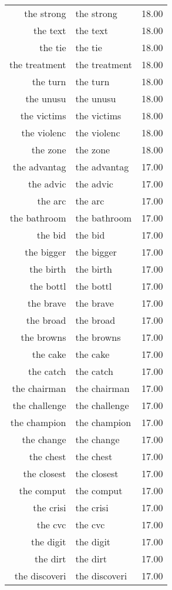 \begin{table}[ht]
\begin{tabular}{rlr}
  the strong & the strong & 18.00 \\ 
  the text & the text & 18.00 \\ 
  the tie & the tie & 18.00 \\ 
  the treatment & the treatment & 18.00 \\ 
  the turn & the turn & 18.00 \\ 
  the unusu & the unusu & 18.00 \\ 
  the victims & the victims & 18.00 \\ 
  the violenc & the violenc & 18.00 \\ 
  the zone & the zone & 18.00 \\ 
  the advantag & the advantag & 17.00 \\ 
  the advic & the advic & 17.00 \\ 
  the arc & the arc & 17.00 \\ 
  the bathroom & the bathroom & 17.00 \\ 
  the bid & the bid & 17.00 \\ 
  the bigger & the bigger & 17.00 \\ 
  the birth & the birth & 17.00 \\ 
  the bottl & the bottl & 17.00 \\ 
  the brave & the brave & 17.00 \\ 
  the broad & the broad & 17.00 \\ 
  the browns & the browns & 17.00 \\ 
  the cake & the cake & 17.00 \\ 
  the catch & the catch & 17.00 \\ 
  the chairman & the chairman & 17.00 \\ 
  the challenge & the challenge & 17.00 \\ 
  the champion & the champion & 17.00 \\ 
  the change & the change & 17.00 \\ 
  the chest & the chest & 17.00 \\ 
  the closest & the closest & 17.00 \\ 
  the comput & the comput & 17.00 \\ 
  the crisi & the crisi & 17.00 \\ 
  the cvc & the cvc & 17.00 \\ 
  the digit & the digit & 17.00 \\ 
  the dirt & the dirt & 17.00 \\ 
  the discoveri & the discoveri & 17.00 \\ 

\end{tabular}
\end{table}

